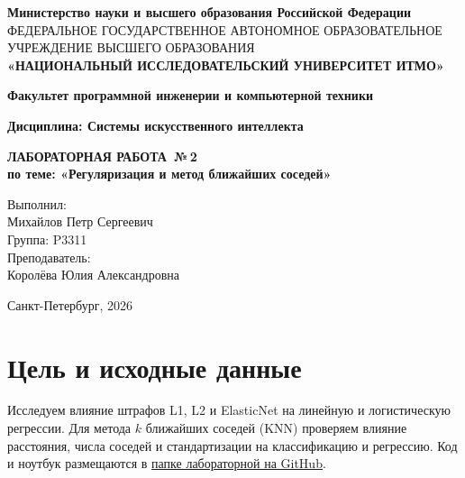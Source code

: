 \documentclass[a4paper,12pt]{article}
\newcommand{\LabSubject}{Системы искусственного интеллекта}
\newcommand{\LabWorkType}{ЛАБОРАТОРНАЯ РАБОТА}
\newcommand{\LabNumber}{2}
\newcommand{\LabTopic}{Регуляризация и метод ближайших соседей}
\newcommand{\LabAuthor}{Михайлов Петр Сергеевич}
\newcommand{\LabGroup}{P3311}
\newcommand{\LabTeacher}{Королёва Юлия Александровна}
\newcommand{\LabYear}{2026}
\begin{document}
\begin{titlepage}
\centering
{\fontsize{11}{13}\selectfont\textbf{Министерство науки и высшего образования Российской Федерации}}\\
{\fontsize{7}{10}\selectfont ФЕДЕРАЛЬНОЕ ГОСУДАРСТВЕННОЕ АВТОНОМНОЕ ОБРАЗОВАТЕЛЬНОЕ УЧРЕЖДЕНИЕ ВЫСШЕГО ОБРАЗОВАНИЯ}\\
\vspace{.2cm}
{\fontsize{14}{17}\selectfont\textbf{«НАЦИОНАЛЬНЫЙ ИССЛЕДОВАТЕЛЬСКИЙ УНИВЕРСИТЕТ ИТМО»}}
\vspace{1cm}

{\fontsize{12}{14}\selectfont\textbf{Факультет программной инженерии и компьютерной техники}}
\vspace{1cm}

{\fontsize{12}{14}\selectfont\textbf{Дисциплина: \LabSubject}}
\vspace*{\fill}

{\fontsize{18}{22}\selectfont\textbf{\LabWorkType\ №\,\LabNumber}}\\
\vspace{.5cm}
{\fontsize{14}{17}\selectfont\textbf{по теме: «\LabTopic»}}
\vspace{1.5cm}

\begin{flushright}
\fontsize{12}{14}\selectfont
Выполнил:\\
\LabAuthor\\
Группа: \LabGroup\\[1em]
Преподаватель:\\
\LabTeacher
\end{flushright}
\vfill
{\fontsize{12}{14}\selectfont Санкт-Петербург, \LabYear}
\end{titlepage}
\setcounter{page}{2}
{\small\setlength{\parskip}{0pt}\tableofcontents}
\newpage

\section{Цель и исходные данные}

Исследуем влияние штрафов L1, L2 и ElasticNet на линейную и логистическую регрессии. Для метода $k$ ближайших соседей (KNN) проверяем влияние расстояния, числа соседей и стандартизации на классификацию и регрессию.
Код и ноутбук размещаются в \href{https://github.com/Axe-On-You/Artificial-intelligence-systems/tree/main/\%D0\%9B\%D0\%B0\%D0\%B1\%D0\%BE\%D1\%80\%D0\%B0\%D1\%82\%D0\%BE\%D1\%80\%D0\%BD\%D0\%B0\%D1\%8F\%202}{папке лабораторной на GitHub}.
\end{document}
